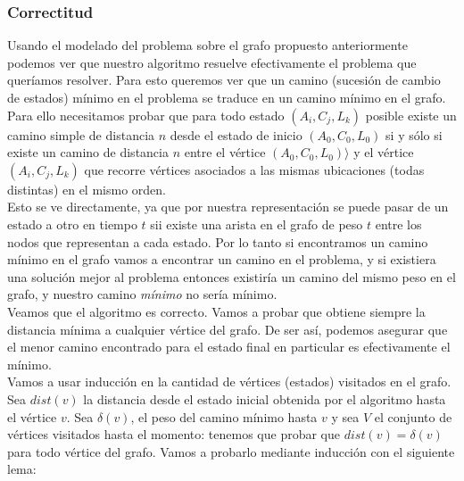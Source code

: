     \subsubsection{Correctitud}

    Usando el modelado del problema sobre el grafo propuesto anteriormente podemos ver que nuestro algoritmo resuelve efectivamente el problema que queríamos resolver. Para esto queremos ver que un camino (sucesión de cambio de estados) mínimo en el problema se traduce en un camino mínimo en el grafo.
    \\

    Para ello necesitamos probar que para todo estado $(A_i,C_j,L_k)$ posible existe un camino simple de distancia $n$ desde el estado de inicio $(A_0,C_0,L_0)$ si y sólo si existe un camino de distancia $n$ entre el vértice $(A_0,C_0,L_0) \rangle$ y el vértice $(A_i, C_j, L_k)$ que recorre vértices asociados a las mismas ubicaciones (todas distintas) en el mismo orden.
    \\

    Esto se ve directamente, ya que por nuestra representación se puede pasar de un estado a otro en tiempo $t$ sii existe una arista en el grafo de peso $t$ entre los nodos que representan a cada estado. Por lo tanto si encontramos un camino mínimo en el grafo vamos a encontrar un camino en el problema, y si existiera una solución mejor al problema entonces existiría un camino del mismo peso en el grafo, y nuestro camino \textit{mínimo} no sería mínimo.
    \\

Veamos que el algoritmo es correcto. Vamos a probar que obtiene siempre la distancia mínima a cualquier vértice del grafo. De ser así, podemos asegurar que el menor camino encontrado para el estado final en particular es efectivamente el mínimo.
\\

Vamos a usar inducción en la cantidad de vértices (estados) visitados en el grafo.
Sea $dist(v)$ la distancia desde el estado inicial obtenida por el algoritmo hasta el vértice $v$. Sea $\delta(v)$, el peso del camino mínimo hasta $v$ y sea $V$ el conjunto de vértices visitados hasta el momento: tenemos que probar que $dist(v) = \delta(v)$ para todo vértice del grafo. Vamos a probarlo mediante inducción con el siguiente lema:
\\


